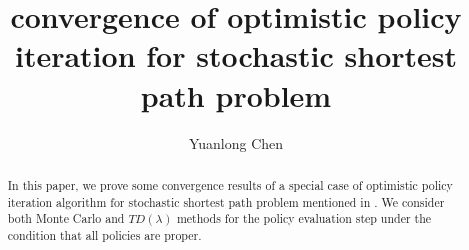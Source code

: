 \documentclass[12pt,a4paper]{amsart}
\numberwithin{equation}{section}
\theoremstyle{plain}
\theoremstyle{definition}
\begin{document}
\title[Convergence for stochastic shortest path]{convergence of optimistic policy iteration for stochastic shortest path problem}


\author[Y. Chen]{Yuanlong Chen}

\address{Department of Mathematics, University of Washington, Seattle, WA, United States} 





















\begin{abstract}  
	In this paper, we prove some convergence results of a special case of optimistic policy iteration algorithm for stochastic shortest path problem mentioned in \cite{Ts03} . We consider both Monte Carlo  and $TD(\lambda)$ methods for the policy evaluation step under the condition that all policies are proper. 
\end{abstract}

\maketitle

\end{document}

